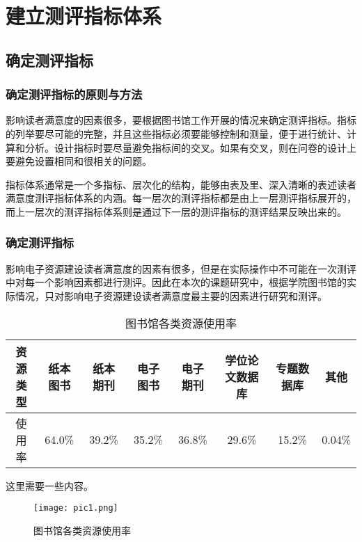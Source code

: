 \section{建立测评指标体系}
    \subsection{确定测评指标}
        \subsubsection{确定测评指标的原则与方法}
            影响读者满意度的因素很多，要根据图书馆工作开展的情况来确定测评指标。指标的列举要尽可能的完整，并且这些指标必须要能够控制和测量，便于进行统计、计算和分析。设计指标时要尽量避免指标间的交叉。如果有交叉，则在问卷的设计上要避免设置相同和很相关的问题。

            指标体系通常是一个多指标、层次化的结构，能够由表及里、深入清晰的表述读者满意度测评指标体系的内涵。每一层次的测评指标都是由上一层测评指标展开的，而上一层次的测评指标体系则是通过下一层的测评指标的测评结果反映出来的。
        \subsubsection{确定测评指标}
            影响电子资源建设读者满意度的因素有很多，但是在实际操作中不可能在一次测评中对每一个影响因素都进行测评。因此在本次的课题研究中，根据学院图书馆的实际情况，只对影响电子资源建设读者满意度最主要的因素进行研究和测评。

            \begin{table}[h]
                \caption{图书馆各类资源使用率}
                \begin{tabular}{|c|c|c|c|c|c|c|c|}
                    \hline 
                    资源类型 & 纸本图书 & 纸本期刊 & 电子图书 & 电子期刊 & 学位论文数据库 & 专题数据库 & 其他 \\
                    \hline
                    使用率 & 64.0\% & 39.2\% & 35.2\% & 36.8\% & 29.6\% & 15.2\% & 0.04\% \\
                    \hline
                \end{tabular}
            \end{table}

            这里需要一些内容。
            
            \begin{figure}[h]
                \texttt{[image: pic1.png]}
                \caption{图书馆各类资源使用率}
            \end{figure}